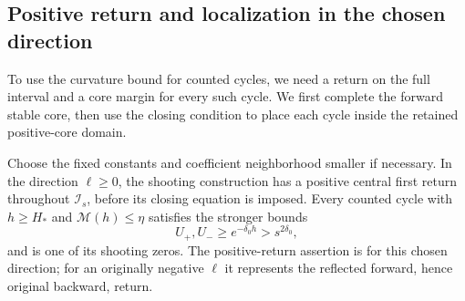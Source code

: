 \subsection{Positive return and localization in the chosen direction}

To use the curvature bound for counted cycles, we need a return on
the full interval and a core margin for every such cycle. We first
complete the forward stable core, then use the closing condition to
place each cycle inside the retained positive-core domain.

\begin{proposition}
\label{rw:source:localization}
Choose the fixed constants and coefficient neighborhood smaller if
necessary. In the direction $\ell\ge0$, the shooting construction
has a positive central first return throughout $\mathcal I_s$, before
its closing equation is imposed. Every counted cycle with
$h\ge H_*$ and $\mathscr M(h)\le\eta$ satisfies the stronger bounds
\begin{equation}\label{rw:source:localization-margin}
 U_+,U_-\ge e^{-\delta_0h}>s^{2\delta_0},
\end{equation}
and is one of its shooting zeros. The positive-return assertion is
for this chosen direction; for an originally negative $\ell$ it
represents the reflected forward, hence original backward, return.
\end{proposition}
